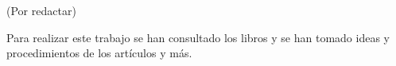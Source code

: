 (Por redactar)

Para realizar este trabajo se han consultado los libros \cite[Introduction to Machine Learning with Python]{machine} \cite[Deep Learning with PyTorch]{pytorch} y se han tomado ideas y procedimientos de los artículos \cite{deeplabcut} y más.